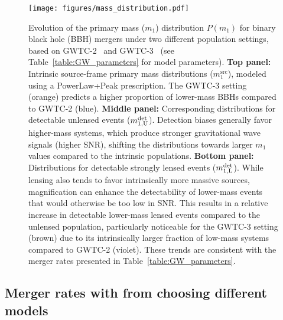 \documentclass[aps,prd,twocolumn,superscriptaddress,groupedaddress,nofootinbib,showpacs,eqsecnum]{revtex4-1}
\begin{document}
\begin{figure}[ht!]
  \centering
  \hspace*{-0.02\textwidth}%
  \texttt{[image: figures/mass\_distribution.pdf]}
  \caption{Evolution of the primary mass ($m_1$) distribution $P(m_1)$ for binary black hole (BBH) mergers under two different population settings, based on GWTC-2~\cite{} and GWTC-3~\cite{} (see Table~\ref{table:GW_parameters} for model parameters).
  \textbf{Top panel:} Intrinsic source-frame primary mass distributions ($m_1^{\text{src}}$), modeled using a PowerLaw+Peak prescription. The GWTC-3 setting (orange) predicts a higher proportion of lower-mass BBHs compared to GWTC-2 (blue).
  \textbf{Middle panel:} Corresponding distributions for detectable unlensed events ($m_{1,\rm U}^{\rm det}$). Detection biases generally favor higher-mass systems, which produce stronger gravitational wave signals (higher SNR), shifting the distributions towards larger $m_1$ values compared to the intrinsic populations.
  \textbf{Bottom panel:} Distributions for detectable strongly lensed events ($m_{1,\rm L}^{\rm det}$). While lensing also tends to favor intrinsically more massive sources, magnification can enhance the detectability of lower-mass events that would otherwise be too low in SNR. This results in a relative increase in detectable lower-mass lensed events compared to the unlensed population, particularly noticeable for the GWTC-3 setting (brown) due to its intrinsically larger fraction of low-mass systems compared to GWTC-2 (violet). These trends are consistent with the merger rates presented in Table~\ref{table:GW_parameters}.
  }
  \label{fig:tau_fedility_test}
\end{figure}

\subsection{Merger rates with from choosing different models}
\end{document}
